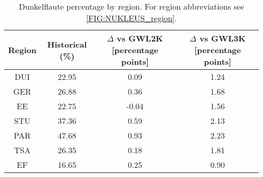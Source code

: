 \begin{table}[!htbp]
\centering
\caption{Dunkelflaute percentage by region. For region abbreviations see \autoref{FIG:NUKLEUS_region}.}
\label{Table:Dunkelflaute_regions}
\begin{tabular}{cccc}
\hline
Region & Historical (\%) & $\Delta$ vs GWL2K [percentage points] & $\Delta$ vs GWL3K [percentage points] \\
\hline
DUI & 22.95 & 0.09 & 1.24\\

GER & 26.88 & 0.36 & 1.68\\

EE & 22.75 & -0.04 & 1.56\\

STU & 37.36 & 0.59 & 2.13\\

PAR & 47.68 & 0.93 & 2.23\\

TSA & 26.35 & 0.18 & 1.81\\

EF & 16.65 & 0.25 & 0.90\\

\bottomrule
\end{tabular}
\end{table}
